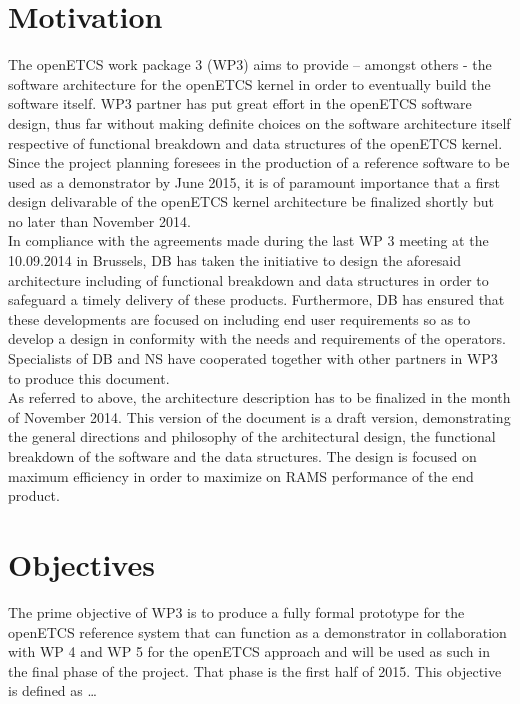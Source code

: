 %

\section{Motivation}
The openETCS work package 3 (WP3) aims to provide – amongst others - the software architecture for the openETCS kernel in order to eventually build the software itself. WP3  partner has put great effort in the openETCS software design, thus far without making definite choices on the software architecture itself respective of functional breakdown and data structures of the openETCS kernel. Since the project planning foresees in the production of a reference software to be used as a demonstrator by June 2015, it is of paramount importance that a first design delivarable of the openETCS kernel architecture be finalized shortly but no later than November 2014.\\

In compliance with the agreements made during the last WP 3 meeting at the 10.09.2014 in Brussels, DB has taken the initiative to design the aforesaid architecture including of functional breakdown and data structures in order to safeguard a timely delivery of these products. Furthermore, DB has ensured that these developments are focused on including end user requirements so as to develop a design in conformity with the needs and requirements of the operators. Specialists of DB and NS have cooperated together with other partners in WP3 to produce this document.\\

As referred to above, the architecture description has to be finalized in the month of November 2014. This version of the document is a draft version, demonstrating the general directions and philosophy of the architectural design, the functional breakdown of the software and the data structures. The design is focused on maximum efficiency in order to maximize on RAMS performance of the end product.\\


\section{Objectives}
The prime objective of WP3 is to produce a fully formal prototype for the openETCS reference system that can function as a demonstrator in collaboration with WP 4 and WP 5  for the openETCS approach and will be used as such in the final phase of the project. That phase is the first half of 2015.  This objective is defined as … 

